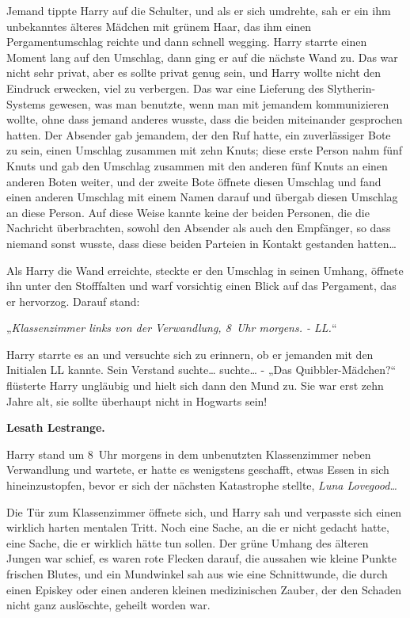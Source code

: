 {Jemand tippte Harry auf die Schulter, und als er sich umdrehte, sah er ein ihm unbekanntes älteres Mädchen mit grünem Haar, das ihm einen Pergamentumschlag reichte und dann schnell wegging. Harry starrte einen Moment lang auf den Umschlag, dann ging er auf die nächste Wand zu. Das war nicht sehr privat, aber es sollte privat genug sein, und Harry wollte nicht den Eindruck erwecken, viel zu verbergen. Das war eine Lieferung des Slytherin-Systems gewesen, was man benutzte, wenn man mit jemandem kommunizieren wollte, ohne dass jemand anderes wusste, dass die beiden miteinander gesprochen hatten. Der Absender gab jemandem, der den Ruf hatte, ein zuverlässiger Bote zu sein, einen Umschlag zusammen mit zehn Knuts; diese erste Person nahm fünf Knuts und gab den Umschlag zusammen mit den anderen fünf Knuts an einen anderen Boten weiter, und der zweite Bote öffnete diesen Umschlag und fand einen anderen Umschlag mit einem Namen darauf und übergab diesen Umschlag an diese Person. Auf diese Weise kannte keine der beiden Personen, die die Nachricht überbrachten, sowohl den Absender als auch den Empfänger, so dass niemand sonst wusste, dass diese beiden Parteien in Kontakt gestanden hatten…

Als Harry die Wand erreichte, steckte er den Umschlag in seinen Umhang, öffnete ihn unter den Stofffalten und warf vorsichtig einen Blick auf das Pergament, das er hervorzog. Darauf stand:

„\emph{Klassenzimmer links von der Verwandlung, 8~Uhr morgens. - LL.}“

Harry starrte es an und versuchte sich zu erinnern, ob er jemanden mit den Initialen LL kannte. Sein Verstand suchte… suchte… - „Das Quibbler-Mädchen?“ flüsterte Harry ungläubig und hielt sich dann den Mund zu. Sie war erst zehn Jahre alt, sie sollte überhaupt nicht in Hogwarts sein!

\textbf{Lesath Lestrange.}

Harry stand um 8~Uhr morgens in dem unbenutzten Klassenzimmer neben Verwandlung und wartete, er hatte es wenigstens geschafft, etwas Essen in sich hineinzustopfen, bevor er sich der nächsten Katastrophe stellte, \emph{Luna Lovegood…}

Die Tür zum Klassenzimmer öffnete sich, und Harry sah und verpasste sich einen wirklich harten mentalen Tritt. Noch eine Sache, an die er nicht gedacht hatte, eine Sache, die er wirklich hätte tun sollen. Der grüne Umhang des älteren Jungen war schief, es waren rote Flecken darauf, die aussahen wie kleine Punkte frischen Blutes, und ein Mundwinkel sah aus wie eine Schnittwunde, die durch einen Episkey oder einen anderen kleinen medizinischen Zauber, der den Schaden nicht ganz auslöschte, geheilt worden war.

}
